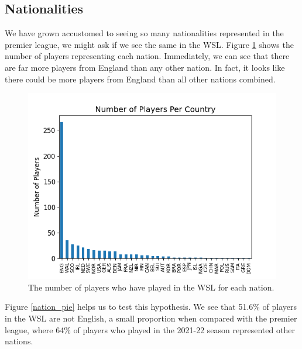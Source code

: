 \documentclass[12pt, a4paper, twocolumn]{article}
\begin{document}
\subsection{Nationalities}

We have grown accustomed to seeing so many nationalities represented in the premier league, we might ask if we see the same in the WSL. Figure \ref{nation_bar} shows the number of players representing each nation. Immediately, we can see that there are far more players from England than any other nation. In fact, it looks like there could be more players from England than all other nations combined.

\begin{figure}
  \includegraphics[width=\linewidth]{../vis/playerStats/nation_bar.png}
  \caption{The number of players who have played in the WSL for each nation.}
  \label{nation_bar}
\end{figure}

Figure \ref{nation_pie} helps us to test this hypothesis. We see that 51.6\% of players in the WSL are not English, a small proportion when compared with the premier league, where 64\% of players who played in the 2021-22 season represented other nations\cite{foreign}. 
\end{document}
